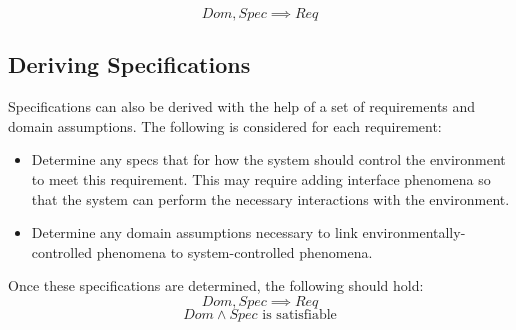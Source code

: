 \documentclass[12pt,titlepage]{article}
\begin{document}
      $$ Dom, Spec \implies Req $$

    \subsection{Deriving Specifications}
      Specifications can also be derived with the help of a set of requirements and domain assumptions. The following is considered for each requirement:
      \begin{itemize}
        \item Determine any specs that for how the system should control the environment to meet this requirement. This may require adding interface phenomena
          so that the system can perform the necessary interactions with the environment.
        \item Determine any domain assumptions necessary to link environmentally-controlled phenomena to system-controlled phenomena.
      \end{itemize}

      Once these specifications are determined, the following should hold:
      $$ Dom, Spec \implies Req $$
      $$ Dom \land Spec \text{ is satisfiable}$$
\end{document}
